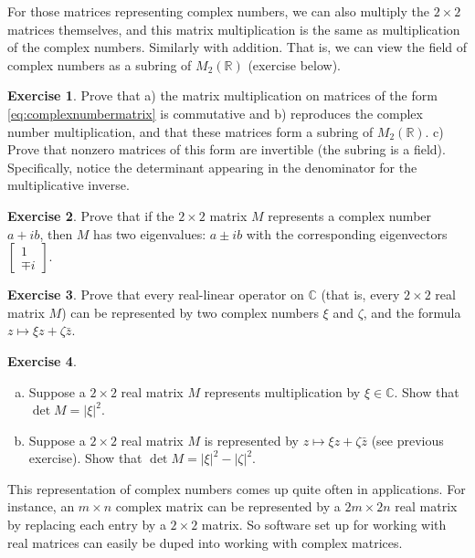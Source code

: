 \documentclass[12pt,openany]{book}
\newcommand{\sabs}[1]{\lvert {#1} \rvert}
\newcommand{\C}{{\mathbb{C}}}
\newcommand{\R}{{\mathbb{R}}}
\theoremstyle{plain}
\theoremstyle{remark}
\theoremstyle{definition}
\newenvironment{exbox}{%
    \def\FrameCommand{\vrule width 1pt \relax\hspace{10pt}}%
    \MakeFramed{\advance\hsize-\width\FrameRestore}%
}{%
    \endMakeFramed
}
\newenvironment{exparts}{%
    \leavevmode\begin{enumerate}[a),noitemsep,topsep=0pt,parsep=0pt,partopsep=0pt]
}{%
    \end{enumerate}
}
\theoremstyle{exercise}
\newtheorem{exercise}{Exercise}[section]
\theoremstyle{example}
\begin{document}
For those matrices representing complex numbers,
we can also multiply the $2 \times 2$ matrices themselves,
and this matrix multiplication is the same as multiplication of the complex
numbers.  Similarly with addition.
That is, we can view the field of complex numbers as a subring of $M_2(\R)$
(exercise below).

\begin{exbox}
\begin{exercise}
Prove that a) the matrix multiplication on matrices of the form
\eqref{eq:complexnumbermatrix}
is commutative and b) reproduces the complex
number multiplication, and that these matrices form a subring of $M_2(\R)$.
c) Prove that nonzero matrices of this form are
invertible (the subring is a field).  Specifically, notice the
determinant appearing in the denominator for the multiplicative inverse.
\end{exercise}

\begin{exercise}
Prove that if the $2 \times 2$ matrix $M$ represents a complex number
$a+ib$, then $M$ has two eigenvalues: $a \pm i b$ with the corresponding
eigenvectors $\left[ \begin{smallmatrix} 1 \\ \mp i \end{smallmatrix}
\right]$.
\end{exercise}

\begin{exercise} \label{exercise:reallinmap}
Prove that every real-linear operator on $\C$ (that is, every 
$2 \times 2$ real matrix $M$) can be represented 
by two complex numbers $\xi$ and $\zeta$, and the formula
$z \mapsto \xi z + \zeta \bar{z}$.
\end{exercise}

\begin{exercise}
\begin{exparts}
\item
Suppose a $2 \times 2$ real matrix $M$ represents multiplication by $\xi \in \C$.
Show that $\det M = \sabs{\xi}^2$.
\item
Suppose a $2 \times 2$ real matrix $M$ is represented by $z \mapsto \xi z + \zeta
\bar{z}$ (see previous exercise).
Show that $\det M = \sabs{\xi}^2 - \sabs{\zeta}^2$.
\end{exparts}
\end{exercise}
\end{exbox}

This representation of complex numbers comes up quite often in applications.
For instance, 
an $m \times n$ complex matrix can be represented by a
$2m \times 2n$ real matrix by replacing each entry by a $2 \times 2$ matrix.
So software set up for working with real matrices can easily be duped into
working with complex matrices.
\end{document}
